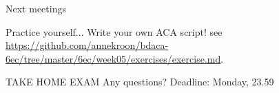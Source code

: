\documentclass[handout]{beamer}
\begin{document}
\begin{frame}{Next meetings}


\begin{block}{Practice yourself... }
Write your own ACA script!
see
 \url{https://github.com/annekroon/bdaca-6ec/tree/master/6ec/week05/exercises/exercise.md}.
\end{block}

\begin{block}{TAKE HOME EXAM}
	Any questions? 
	Deadline: Monday, 23.59
\end{block}


\end{frame}


\begin{frame}[plain]
	\printbibliography
\end{frame}
\end{document}
